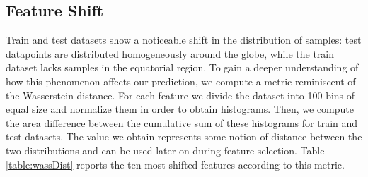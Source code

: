 \documentclass{article}
\begin{document}
    \subsection{Feature Shift}
    Train and test datasets show a noticeable shift in the distribution of samples: test datapoints are distributed homogeneously around the globe, while the train dataset lacks samples in the equatorial region. To gain a deeper understanding of how this phenomenon affects our prediction, we compute a metric reminiscent of the Wasserstein distance. For each feature we divide the dataset into 100 bins of equal size and normalize them in order to obtain histograms. Then, we compute the area difference between the cumulative sum of these histograms for train and test datasets. The value we obtain represents some notion of distance between the two distributions and can be used later on during feature selection. Table \ref{table:wassDist} reports the ten most shifted features according to this metric. 
\end{document}
